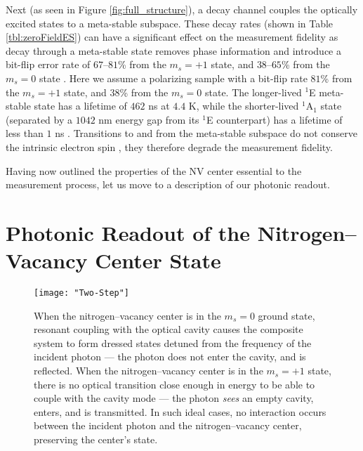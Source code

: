 \documentclass[aps,pra,amsmath,amssymb,reprint,superscriptaddress,tightenlines]{revtex4-1}
\begin{document}
Next (as seen in Figure \ref{fig:full_structure}), a decay channel couples the optically excited states to a meta-stable subspace. These decay rates (shown in Table \ref{tbl:zeroFieldES}) can have a significant effect on the measurement fidelity as decay through a meta-stable state removes phase information and introduce a bit-flip error rate of $67$--$81$\% from the $m_{s}=+1$ state, and $38$--$65$\% from the $m_{s}=0$ state \cite{Robledo11b,Tetienne12}. Here we assume a polarizing sample with a bit-flip rate $81$\% from the $m_{s}=+1$ state, and $38$\% from the $m_{s}=0$ state. The longer-lived $^{1}$E meta-stable state has a lifetime of $462$ ns at $4.4$ K, while the shorter-lived $^{1}$A$_{1}$ state (separated by a $1042$ nm energy gap from its $^{1}$E counterpart)  has a lifetime of less than $1$ ns \cite{Acosta10}.  Transitions to and from the meta-stable subspace do not conserve the intrinsic electron spin \cite{Goldman15}, they therefore degrade the measurement fidelity.

Having now outlined the properties of the NV center essential to the measurement process, let us move to a description of our photonic readout.

\section{Photonic Readout of the Nitrogen--Vacancy Center State} 
\label{sec:photonic_readout_of_the_nitrogen_vacancy_center_state}

\begin{figure}[hbt]
\texttt{[image: "Two-Step"]}
\caption{When the nitrogen--vacancy center is in the $m_{s}=0$ ground state, resonant coupling with the optical cavity causes the composite system to form dressed states detuned from the frequency of the incident photon --- the photon does not enter the cavity, and is reflected. When the nitrogen--vacancy center is in the $m_{s}=+1$ state, there is no optical transition close enough in energy to be able to couple with the cavity mode --- the photon \emph{sees} an empty cavity, enters, and is transmitted. In such ideal cases, no interaction occurs between the incident photon and the nitrogen--vacancy center, preserving the center's state.}
\label{fig:two_step_measurement} 
\end{figure}
\end{document}
